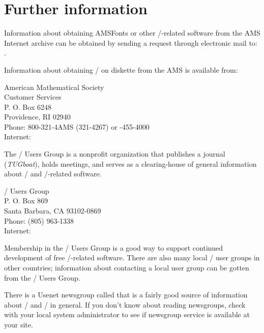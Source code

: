 \documentclass[leqno,titlepage,openany]{amsldoc}
\newcommand{\journalname}[1]{\textit{#1}}
\newenvironment{infoaddress}{%
  \par\topsep\medskipamount
  \trivlist\centering
  \item[]%
  \begin{minipage}{.7\columnwidth}%
  \raggedright
}{%
  \end{minipage}%
  \endtrivlist
}
\begin{document}
\section{Further information}\label{a:furtherinfo}
Information about obtaining AMSFonts or other \tex/-related
software from the AMS Internet archive 
can be obtained by sending a request through electronic mail to:
.\pagebreak

Information about obtaining \amslatex/ on diskette from the AMS is
available from:
\begin{infoaddress}
American Mathematical Society\\
Customer Services\\
P. O. Box 6248\\
Providence, RI 02940\\[3pt]
Phone: 800-321-4AMS (321-4267) \quad or -455-4000\\
Internet: 
\end{infoaddress}

The \tex/ Users Group is a nonprofit
organization that publishes a journal
(\journalname{TUGboat}\index{TUGboat@\journalname{TUGboat}}), holds
meetings, and serves as a clearing-house of general information about
\tex/ and \tex/-related software.
\begin{infoaddress}
\tex/ Users Group\\
P. O. Box 869\\
Santa Barbara, CA 93102-0869\\[3pt]
Phone: (805) 963-1338\\
Internet: \\
\end{infoaddress}
Membership in the \tex/ Users Group is a good way to support continued
development of free \tex/-related software. There are also many local
\tex/ user groups in other countries; information about contacting a
local user group can be gotten from the \tex/ Users Group.

There is a Usenet newsgroup called  that is a fairly
good source of information about \latex/ and \tex/ in general. If you
don't know about reading newsgroups, check with your local system
administrator to see if newsgroup service is available at your site.
\end{document}
